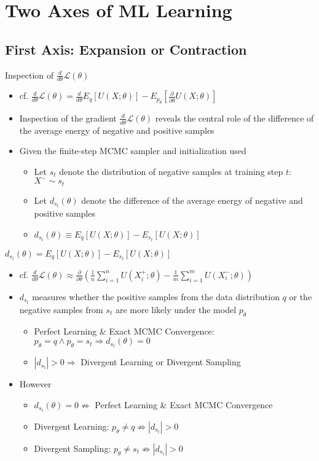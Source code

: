 \documentclass{beamer}
\begin{document}
\section{Two Axes of ML Learning}
\subsection{First Axis: Expansion or Contraction}
\begin{frame}{Inspection of $\frac{d}{d\theta}\mathcal{L}(\theta)$}
\begin{itemize}
\item cf. $\frac{d}{d\theta}\mathcal{L}(\theta)=\frac{d}{d\theta}E_q[U(X;\theta)]-E_{p_\theta}[\frac{\partial}{\partial\theta}U(X;\theta)]$
\item Inspection of the gradient $\frac{d}{d\theta}\mathcal{L}(\theta)$ reveals the central role of the difference of the average energy of negative and positive samples
\item Given the finite-step MCMC sampler and initialization used\begin{itemize}
\item Let $s_t$ denote the distribution of negative samples at training step $t$: $X^-\sim s_t$
\item Let $d_{s_t}(\theta)$ denote the difference of the average energy of negative and positive samples
\item $d_{s_t}(\theta)\equiv E_q[U(X;\theta)]-E_{s_t}[U(X;\theta)]$
\end{itemize}
\end{itemize}
\end{frame}

\begin{frame}{$d_{s_t}(\theta)=E_q[U(X;\theta)]-E_{s_t}[U(X;\theta)]$}
\begin{itemize}
\item cf. $\frac{d}{d\theta}\mathcal{L}(\theta)\approx\frac{\partial}{\partial\theta}(\frac{1}{n}\sum_{i=1}^n U(X_i^+;\theta)-\frac{1}{m}\sum_{i=1}^m U(X_i^-;\theta))$
\item $d_{s_t}$ measures whether the positive samples from the data distribution $q$ or the negative samples from $s_t$ are more likely under the model $p_\theta$
\begin{itemize}
\item Perfect Learning \& Exact MCMC Convergence: $p_\theta=q\land p_\theta=s_t\Rightarrow d_{s_t}(\theta)=0$
\item $|d_{s_t}|>0\Rightarrow$ Divergent Learning or Divergent Sampling
\end{itemize}
\item However\begin{itemize}
\item $d_{s_t}(\theta)=0\not\Rightarrow$ Perfect Learning \& Exact MCMC Convergence
\item Divergent Learning: $p_\theta\ne q\not\Rightarrow |d_{s_t}|>0$
\item Divergent Sampling: $p_\theta\ne s_t\not\Rightarrow |d_{s_t}|>0$
\end{itemize}
\end{itemize}
\end{frame}
\end{document}
